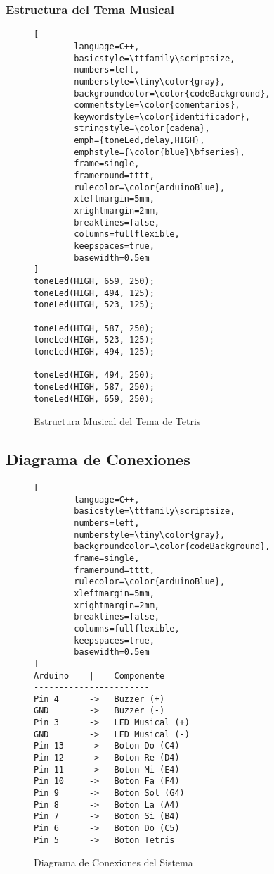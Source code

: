 \subsubsection{Estructura del Tema Musical}
\begin{figure}[H]
	\centering
	\begin{lstlisting}[
		language=C++,
		basicstyle=\ttfamily\scriptsize,
		numbers=left,
		numberstyle=\tiny\color{gray},
		backgroundcolor=\color{codeBackground},
		commentstyle=\color{comentarios},
		keywordstyle=\color{identificador},
		stringstyle=\color{cadena},
		emph={toneLed,delay,HIGH},
		emphstyle={\color{blue}\bfseries},
		frame=single,
		frameround=tttt,
		rulecolor=\color{arduinoBlue},
		xleftmargin=5mm,
		xrightmargin=2mm,
		breaklines=false,
		columns=fullflexible,
		keepspaces=true,
		basewidth=0.5em 
]
toneLed(HIGH, 659, 250);  
toneLed(HIGH, 494, 125);  
toneLed(HIGH, 523, 125);  

toneLed(HIGH, 587, 250);  
toneLed(HIGH, 523, 125);  
toneLed(HIGH, 494, 125);  

toneLed(HIGH, 494, 250);  
toneLed(HIGH, 587, 250);  
toneLed(HIGH, 659, 250);  
	\end{lstlisting}
	\caption{Estructura Musical del Tema de Tetris}
	\label{fig:music-structure}
\end{figure}

\subsection{Diagrama de Conexiones}
\begin{figure}[H]
	\centering
	\begin{lstlisting}[
		language=C++,
		basicstyle=\ttfamily\scriptsize,
		numbers=left,
		numberstyle=\tiny\color{gray},
		backgroundcolor=\color{codeBackground},
		frame=single,
		frameround=tttt,
		rulecolor=\color{arduinoBlue},
		xleftmargin=5mm,
		xrightmargin=2mm,
		breaklines=false,
		columns=fullflexible,
		keepspaces=true,
		basewidth=0.5em 
]
Arduino    |    Componente
-----------------------
Pin 4      ->   Buzzer (+)
GND        ->   Buzzer (-)
Pin 3      ->   LED Musical (+)
GND        ->   LED Musical (-)
Pin 13     ->   Boton Do (C4)
Pin 12     ->   Boton Re (D4)
Pin 11     ->   Boton Mi (E4)
Pin 10     ->   Boton Fa (F4)
Pin 9      ->   Boton Sol (G4)
Pin 8      ->   Boton La (A4)
Pin 7      ->   Boton Si (B4)
Pin 6      ->   Boton Do (C5)
Pin 5      ->   Boton Tetris
	\end{lstlisting}
	\caption{Diagrama de Conexiones del Sistema}
	\label{fig:connection-diagram}
\end{figure}

